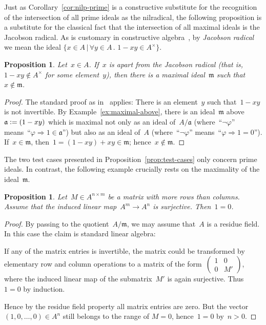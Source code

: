 \documentclass[com,11pt,crcready]{iosart2x}
\theoremstyle{definition}
\theoremstyle{plain}
\newtheorem{proposition}[definition]{Proposition}
\theoremstyle{remark}
\newcommand{\aaa}{\mathfrak{a}}
\newcommand{\mmm}{\mathfrak{m}}
\newcommand{\defeq}{\vcentcolon=}
\renewcommand{\_}{\mathpunct{.}\,}
\begin{document}
Just as Corollary~\ref{cor:nilp-prime} is a constructive substitute
for the recognition of the intersection of all prime ideals as the nilradical,
the following proposition is a substitute for the classical fact that
the intersection of all maximal ideals is the Jacobson radical.
%
As is customary in constructive
algebra~\cite[Section~IX.1]{lombardi-quitte:constructive-algebra}, by
\emph{Jacobson radical} we mean the ideal
$\{ x \in A \,|\, \forall y \in A\_ 1 - xy \in A^\times \}$.

\begin{proposition}\label{prop:jac}Let~$x \in A$. If~$x$ is \emph{apart} from the Jacobson radical (that is, $1-xy \not\in A^\times$ for some element~$y$), then
there is a maximal ideal~$\mmm$ such that~$x \not\in \mmm$.
\end{proposition}

\begin{proof}The standard proof as
in~\cite[Lemma~IX.1.1]{lombardi-quitte:constructive-algebra} applies: There is
an element~$y$ such that~$1-xy$
is not invertible. By Example~\ref{ex:maximal-above}, there is an ideal~$\mmm$
above~$\aaa \defeq (1-xy)$ which is maximal not only as an ideal of~$A/\aaa$
(where~``$\neg\varphi$'' means~``$\varphi \Rightarrow 1 \in \aaa$'') but also as an
ideal of~$A$ (where~``$\neg\varphi$'' means~``$\varphi \Rightarrow 1 = 0$''). If~$x
\in \mmm$, then~$1 = (1-xy) + xy \in \mmm$; hence~$x \not\in \mmm$.
\end{proof}

The two test cases presented in Proposition~\ref{prop:test-cases} only concern
prime ideals. In contrast, the following example crucially rests on the
maximality of the ideal~$\mmm$.

\begin{proposition}\label{prop:surj-matrix}Let~$M \in A^{n \times m}$ be a matrix with more rows than
columns. Assume that the induced linear map~$A^m \to A^n$ is surjective.
Then~$1 = 0$.
\end{proposition}

\begin{proof}By passing to the quotient~$A/\mmm$, we may assume that~$A$ is a
residue field. In this case the claim is standard linear algebra:

If any of the matrix entries
is invertible, the matrix could be transformed by elementary row and
column operations to a matrix of the form~$\left(\begin{smallmatrix}1 & 0 \\ 0 &
M'\end{smallmatrix}\right)$, where the induced linear map of the submatrix~$M'$ is again
surjective. Thus~$1 = 0$ by induction.

Hence by the residue field property all matrix entries are zero.
But the vector $(1,0,\ldots,0)\in A^n$ still
belongs to the range of $M=0$, hence~$1=0$ by~$n > 0$.
\end{proof}
\end{document}
